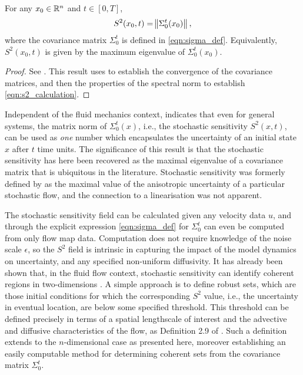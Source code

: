 \begin{theorem}[Computation of \(S^2\)]\label{thm:s2_calculation}
	For any \(x_0 \in \mathbb{R}^n\) and \(t \in [0,T]\),
	\begin{equation}
		S^2\!\left(x_0,t\right) = \norm{\Sigma_0^t\!\left(x_0\right)},
		\label{eqn:s2_calculation}
	\end{equation}
	where the covariance matrix \(\Sigma_0^t\) is defined in \cref{eqn:sigma_def}.
	Equivalently, \(S^2\!\left(x_0,t\right)\) is given by the maximum eigenvalue of \(\Sigma_0^t\!\left(x_0\right)\).
\end{theorem}
\begin{proof}
	See .
	This result uses  to establish the convergence of the covariance matrices, and then the properties of the spectral norm to establish \cref{eqn:s2_calculation}.
\end{proof}

Independent of the fluid mechanics context,  indicates that even for general systems, the matrix norm of \(\Sigma_0^t(x)\), i.e., the stochastic sensitivity \(S^2(x,t)\), can be used as {\em one} number which encapsulates the uncertainty of an initial state \(x\) after \(t\) time units.
The significance of this result is that the stochastic sensitivity has here been recovered as the maximal eigenvalue of a covariance matrix that is ubiquitous in the literature.
Stochastic sensitivity was formerly defined by \citet{Balasuriya_2020_StochasticSensitivityComputable} as the maximal value of the anisotropic uncertainty of a particular stochastic flow, and the connection to a linearisation was not apparent.

The stochastic sensitivity field can be calculated given any velocity data \(u\), and through the explicit expression \cref{eqn:sigma_def} for \(\Sigma_0^t\) can even be computed from only flow map data.
Computation does not require knowledge of the noise scale \(\epsilon\), so the \(S^2\) field is intrinsic in capturing the impact of the model dynamics on uncertainty, and any specified non-uniform diffusivity.
It has already been shown that, in the fluid flow context, stochastic sensitivity can identify coherent regions in two-dimensions \citep{BadzaEtAl_2023_HowSensitiveAre, Balasuriya_2020_StochasticSensitivityComputable}.
A simple approach is to define robust sets, which are those initial conditions for which the corresponding \(S^2\) value, i.e., the uncertainty in eventual location, are below some specified threshold.
This threshold can be defined precisely in terms of a spatial lengthscale of interest and the advective and diffusive characteristics of the flow, as Definition 2.9 of \citet{Balasuriya_2020_StochasticSensitivityComputable}.
Such a definition extends to the \(n\)-dimensional case as presented here, moreover establishing an easily computable method for determining coherent sets from the covariance matrix \(\Sigma_0^t\).

